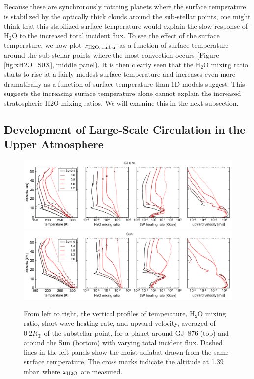 \documentclass[11pt,numberedappendix,twocolappendix,]{emulateapj}
\def\water{H$_2$O }
\def\xwater{$x_{\rm H2O,\,1mbar}$ }
\def\preslevel{1.39 mbar\ }
\begin{document}
Because these are synchronously rotating planets where the surface temperature is stabilized by the optically thick clouds around the sub-stellar points, one might think that this stabilized surface temperature would explain the slow  response of \water to the increased total incident flux. 
To see the effect of the surface temperature, we now plot \xwater as a function of surface temperature around the sub-stellar points where the most convection occurs (Figure \ref{fig:xH2O_S0X}, middle panel). 
It is then clearly seen that the \water mixing ratio starts to rise at a fairly modest surface temperature and increases even more dramatically as a function of surface temperature than 1D models suggest. 
This suggests the increasing surface temperature alone cannot explain the increased stratospheric H2O mixing ratios. 
We will examine this in the next subsection. 

\subsection{Development of Large-Scale Circulation in the Upper Atmosphere}
\label{ss:result_omega}


\begin{figure}[htb]
    \begin{center}
    \includegraphics[width=1\hsize]{fig/AqOH0TLS_GJ876_temp_xH2O_vz_heat.pdf}
    \includegraphics[width=1\hsize]{fig/AqOH0TLS_Sun_temp_xH2O_vz_heat.pdf}
    \end{center}
\caption{From left to right, the vertical profiles of temperature, \water mixing ratio, short-wave heating rate, and upward velocity, averaged of $0.2R_{\oplus }$ of the substellar point, for a planet around GJ~876 (top) and around the Sun (bottom) with varying total incident flux. Dashed lines in the left panels show the moist adiabat drawn from the same surface temperature. The cross marks indicate the altitude at \preslevel where  $x_{\rm H2O}$ are measured. }
\label{fig:AqOH0TLS_GJ876_temp_xH2O_vz_heat}
\end{figure}
\end{document}
